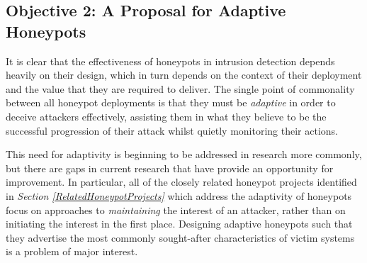 \subsection{Objective 2: A Proposal for Adaptive Honeypots} \label{Objective2}

It is clear that the effectiveness of honeypots in intrusion detection depends heavily on their design, which in turn depends on the context of their deployment and the value that they are required to deliver. The single point of commonality between all honeypot deployments is that they must be \textit{adaptive} in order to deceive attackers effectively, assisting them in what they believe to be the successful progression of their attack whilst quietly monitoring their actions. 

This need for adaptivity is beginning to be addressed in research more commonly, but there are gaps in current research that have provide an opportunity for improvement. In particular, all of the closely related honeypot projects identified in \textit{Section \ref{RelatedHoneypotProjects}} which address the adaptivity of honeypots focus on approaches to \textit{maintaining} the interest of an attacker, rather than on initiating the interest in the first place. \cite{CowrieWebsite} \cite{IoTPot2016} \cite{IoTCandyJar} Designing adaptive honeypots such that they advertise the most commonly sought-after characteristics of victim systems is a problem of major interest.




